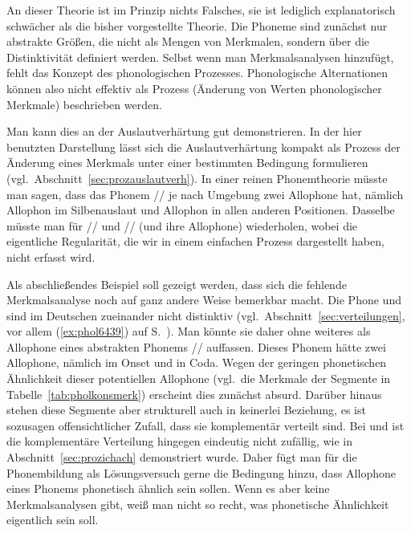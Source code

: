 \begin{exe}
  \ex\label{ex:phol2209}
  \begin{xlist}
  \end{xlist}
\end{exe}

An dieser Theorie ist im Prinzip nichts Falsches, sie ist lediglich explanatorisch schwächer als die bisher vorgestellte Theorie.
Die Phoneme sind zunächst nur abstrakte Größen, die nicht als Mengen von Merkmalen, sondern über die Distinktivität definiert werden.
Selbst wenn man Merkmalsanalysen hinzufügt, fehlt das Konzept des phonologischen Prozesses.
Phonologische Alternationen können also nicht effektiv als Prozess (Änderung von Werten phonologischer Merkmale) beschrieben werden.

Man kann dies an der Auslautverhärtung gut demonstrieren.
In der hier benutzten Darstellung lässt sich die Auslautverhärtung kompakt als Prozess der Änderung eines Merkmals unter einer bestimmten Bedingung formulieren (vgl.\ Abschnitt~\ref{sec:prozauslautverh}).
In einer reinen Phonemtheorie müsste man sagen, dass das Phonem // je nach Umgebung zwei Allophone hat, nämlich Allophon \textipa{[p]} im Silbenauslaut und Allophon \textipa{[b]} in allen anderen Positionen.
Dasselbe müsste man für // und // (und ihre Allophone) wiederholen, wobei die eigentliche Regularität, die wir in einem einfachen Prozess dargestellt haben, nicht erfasst wird.

Als abschließendes Beispiel soll gezeigt werden, dass sich die fehlende Merk\-mals\-ana\-lyse noch auf ganz andere Weise bemerkbar macht.
Die Phone \textipa{[h]} und \textipa{[N]} sind im Deutschen zueinander nicht distinktiv (vgl.\ Abschnitt~\ref{sec:verteilungen}, vor allem (\ref{ex:phol6439}) auf S.~\pageref{ex:phol6439}).
Man könnte sie daher ohne weiteres als Allophone eines abstrakten Phonems // auffassen.
Dieses Phonem hätte zwei Allophone, nämlich \textipa{[h]} im Onset und \textipa{[N]} in Coda.
Wegen der geringen phonetischen Ähnlichkeit dieser potentiellen Allophone (vgl.\ die Merkmale der Segmente in Tabelle~\ref{tab:pholkonsmerk}) erscheint dies zunächst absurd.
Darüber hinaus stehen diese Segmente aber strukturell auch in keinerlei Beziehung, es ist sozusagen offensichtlicher Zufall, dass sie komplementär verteilt sind.
Bei \textipa{[\c{c}]} und \textipa{[X]} ist die komplementäre Verteilung hingegen eindeutig nicht zufällig, wie in Abschnitt~\ref{sec:prozichach} demonstriert wurde.
Daher fügt man für die Phonembildung als Lösungsversuch gerne die Bedingung hinzu, dass Allophone eines Phonems phonetisch ähnlich sein sollen.
Wenn es aber keine Merkmalsanalysen gibt, weiß man nicht so recht, was phonetische Ähnlichkeit eigentlich sein soll.

